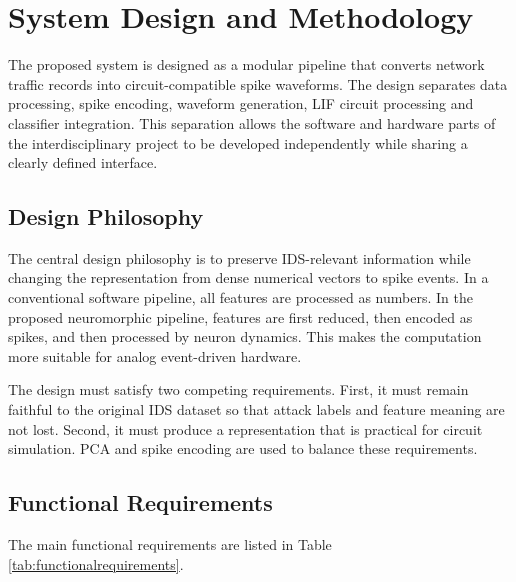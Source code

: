 \chapter{System Design and Methodology}

The proposed system is designed as a modular pipeline that converts network traffic records into circuit-compatible spike waveforms. The design separates data processing, spike encoding, waveform generation, LIF circuit processing and classifier integration. This separation allows the software and hardware parts of the interdisciplinary project to be developed independently while sharing a clearly defined interface.

\section{Design Philosophy}

The central design philosophy is to preserve IDS-relevant information while changing the representation from dense numerical vectors to spike events. In a conventional software pipeline, all features are processed as numbers. In the proposed neuromorphic pipeline, features are first reduced, then encoded as spikes, and then processed by neuron dynamics. This makes the computation more suitable for analog event-driven hardware.

The design must satisfy two competing requirements. First, it must remain faithful to the original IDS dataset so that attack labels and feature meaning are not lost. Second, it must produce a representation that is practical for circuit simulation. PCA and spike encoding are used to balance these requirements.

\section{Functional Requirements}

The main functional requirements are listed in Table \ref{tab:functionalrequirements}.


